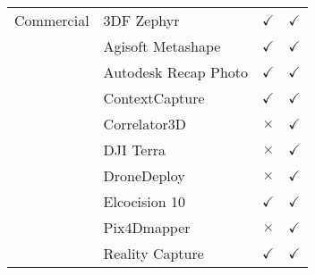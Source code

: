 \begin{table}[htb]
\begin{center}
\begin{threeparttable}
\begin{tabular*}{\linewidth}{@{\extracolsep{\fill}} clcc}
        Commercial                         & 3DF Zephyr                                                                                                      & $\checkmark$         & $\checkmark$        \\
                                           & Agisoft Metashape                                                                                               & $\checkmark$         & $\checkmark$        \\
                                           & Autodesk Recap Photo                                                                                            & $\checkmark$         & $\checkmark$        \\ 
                                           & ContextCapture                                                                                                  & $\checkmark$         & $\checkmark$        \\
                                           & Correlator3D                                                                                                    & $\times$             & $\checkmark$        \\
                                           & DJI Terra \tnote{4}                                                                                             & $\times$             & $\checkmark$        \\
                                           & DroneDeploy                                                                                                     & $\times$             & $\checkmark$        \\
                                           & Elcocision 10                                                                                                   & $\checkmark$         & $\checkmark$        \\
                                           & Pix4Dmapper                                                                                                     & $\times$             & $\checkmark$        \\
                                           & Reality Capture                                                                                                 & $\checkmark$         & $\checkmark$        \\ \hline
      \end{tabular*}
      \begin{tablenotes}
        \footnotesize

\end{tablenotes}
\end{threeparttable}
\end{center}
\end{table}
